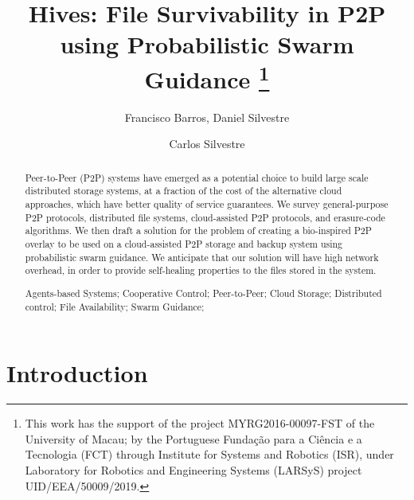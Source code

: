 \documentclass[runningheads]{llncs}
\begin{document}
\title {Hives: File Survivability in P2P using Probabilistic Swarm Guidance
\thanks{This work has the support of the project MYRG2016-00097-FST of the University of Macau; by the Portuguese Fundação para a Ciência e a Tecnologia (FCT) through Institute for Systems and Robotics (ISR), under Laboratory for Robotics and Engineering Systems (LARSyS) project UID/EEA/50009/2019.}
}
\author{Francisco Barros, Daniel Silvestre \and Carlos Silvestre}
\maketitle
\begin{abstract}
Peer-to-Peer (P2P) systems have emerged as a potential choice to build large scale distributed storage systems, at a fraction of the cost of the alternative cloud approaches, which have better quality of service guarantees. We survey general-purpose P2P protocols, distributed file systems, cloud-assisted P2P protocols, and erasure-code algorithms. We then draft a solution for the problem of creating a bio-inspired P2P overlay to be used on a cloud-assisted P2P storage and backup system using probabilistic swarm guidance. We anticipate that our solution will have high network overhead, in order to provide self-healing properties to the files stored in the system.

\begin{keywords}Agents-based Systems; Cooperative Control; Peer-to-Peer; Cloud Storage; Distributed control; File Availability; Swarm Guidance;\end{keywords}
\end{abstract}

\setcounter{tocdepth}{3}
\tableofcontents

\newpage\section{Introduction}\label{sec:intro}
\end{document}
